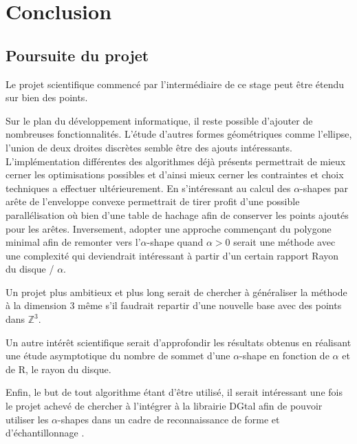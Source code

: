 \section{Conclusion}

\subsection{Poursuite du projet}

Le projet scientifique commencé par l'intermédiaire de ce stage peut être étendu sur bien des points. 

Sur le plan du développement informatique, il reste possible d'ajouter de nombreuses fonctionnalités. L’étude d'autres formes géométriques comme l'ellipse, l'union de deux droites discrètes semble être des ajouts intéressants. L'implémentation différentes des algorithmes déjà présents permettrait de mieux cerner les optimisations possibles et d'ainsi mieux cerner les contraintes et choix techniques a effectuer ultérieurement. En s'intéressant au calcul des $\alpha$-shapes par arête de l'enveloppe convexe permettrait de tirer profit d'une possible parallélisation où bien d'une table de hachage afin de conserver les points ajoutés pour les arêtes. Inversement, adopter une approche commençant du polygone minimal afin de remonter vers l'$\alpha$-shape quand $\alpha > 0$ serait une méthode avec une complexité qui deviendrait intéressant à partir d'un certain rapport Rayon du disque / $\alpha$.

Un projet plus ambitieux et plus long serait de chercher à généraliser la méthode à la dimension 3 même s'il faudrait repartir d'une nouvelle base avec des points dans $\mathbb{Z}^{3}$. 

Un autre intérêt scientifique serait d'approfondir les résultats obtenus en réalisant une étude asymptotique du nombre de sommet d'une $\alpha$-shape en fonction de $\alpha$ et de R, le rayon du disque.

Enfin, le but de tout algorithme étant d'être utilisé, il serait intéressant une fois le projet achevé de chercher à l'intégrer à la librairie DGtal afin de pouvoir utiliser les $\alpha$-shapes dans un cadre de reconnaissance de forme et d’échantillonnage \cite{BernardiniB97}.


